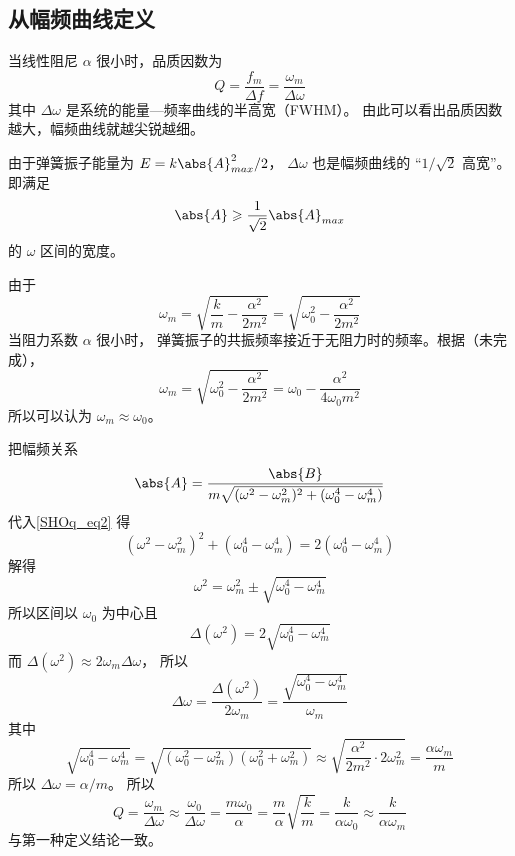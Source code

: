 \subsection{从幅频曲线定义}
当线性阻尼 $\alpha$ 很小时，品质因数为
\begin{equation}
Q = \frac{f_m}{\Delta {f}} = \frac{\omega_m}{\Delta \omega}
\end{equation}
其中 $\Delta\omega$ 是系统的能量—频率曲线的半高宽（FWHM）。%
由此可以看出品质因数越大，幅频曲线就越尖锐越细。

由于弹簧振子能量为 $E = k\abs{A}_{max}^2/2$， $\Delta \omega$ 也是幅频曲线的 “$1/\sqrt{2}$ 高宽”。 即满足
\begin{equation}\label{SHOq_eq2}
\abs{A} \geqslant \frac{1}{\sqrt{2}} \abs{A}_{max}
\end{equation}
的 $\omega$ 区间的宽度。

由于
\begin{equation}
\omega_m = \sqrt{\frac{k}{m} - \frac{\alpha^2}{2m^2}} = \sqrt{\omega_0^2 - \frac{\alpha^2}{2m^2}}
\end{equation}
当阻力系数 $\alpha$ 很小时， 弹簧振子的共振频率接近于无阻力时的频率。根据（未完成），
\begin{equation}
\omega_m = \sqrt{\omega_0^2 - \frac{\alpha^2}{2m^2}} = \omega_0 - \frac{\alpha^2}{4\omega_0 m^2}
\end{equation}
所以可以认为 $\omega_m \approx \omega_0$。

把幅频关系
\begin{equation}
\abs{A} = \frac{\abs{B}}{m\sqrt{(\omega^2 - \omega_m^2)^2 + (\omega_0^4 - \omega_m^4)}}
\end{equation}
代入\autoref{SHOq_eq2} 得
\begin{equation}
(\omega^2 - \omega_m^2)^2 + (\omega_0^4 - \omega_m^4) = 2(\omega_0^4 - \omega_m^4)
\end{equation}
解得
\begin{equation}
\omega^2 = \omega_m^2 \pm \sqrt{\omega_0^4 - \omega_m^4}
\end{equation}
所以区间以 $\omega_0$ 为中心且
\begin{equation}
\Delta(\omega^2) = 2\sqrt{\omega_0^4 - \omega_m^4}
\end{equation}
而 $\Delta(\omega^2) \approx 2\omega_m \Delta \omega$， 所以
\begin{equation}
\Delta \omega =  \frac{\Delta(\omega^2)}{2\omega_m} = \frac{\sqrt{\omega_0^4 - \omega_m^4}}{\omega_m}
\end{equation}
其中
\begin{equation}
\sqrt{\omega_0^4 - \omega_m^4} = \sqrt{(\omega_0^2 - \omega_m^2)(\omega_0^2 + \omega_m^2)}
\approx \sqrt{\frac{\alpha^2}{2m^2} \cdot 2\omega_m^2} = \frac{\alpha\omega_m}{m}
\end{equation}
所以 $\Delta \omega = {\alpha}/{m}$。 所以
\begin{equation}
Q = \frac{\omega_m}{\Delta \omega} \approx \frac{\omega_0}{\Delta \omega} = \frac{m\omega_0}{\alpha} = \frac{m}{\alpha} \sqrt{\frac{k}{m}} = \frac{k}{\alpha \omega_0}
\approx \frac{k}{\alpha\omega_m}
\end{equation}
与第一种定义结论一致。
